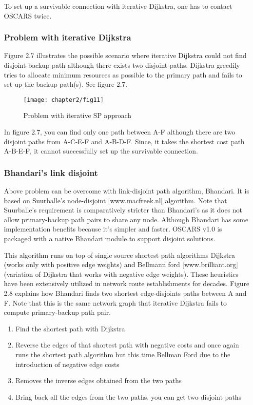 To set up a survivable connection with iterative Dijkstra, one has to contact OSCARS twice.

\subsubsection{Problem with iterative Dijkstra}
\indent Figure 2.7 illustrates the possible scenario where iterative Dijkstra could not find disjoint-backup path although there exists two disjoint-paths. Dijkstra greedily tries to allocate minimum resources as possible to the primary path and fails to set up the backup path(s). See figure 2.7.
\begin{figure*}[hbt!]
\centering
\texttt{[image: chapter2/fig11]}
\caption{Problem with iterative SP approach}
\label{fig:problemInIspa}
\end{figure*}

\indent In figure 2.7, you can find only one path between A-F although there are two disjoint paths from A-C-E-F and A-B-D-F. Since, it takes the shortest cost path A-B-E-F, it cannot successfully set up the survivable connection.


\subsubsection{Bhandari's link disjoint} 
Above problem can be overcome with link-disjoint path algorithm, Bhandari. It is based on Suurballe's node-disjoint [www.macfreek.nl] algorithm. Note that Suurballe's requirement is comparatively stricter than Bhandari's as it does not allow primary-backup path pairs to share any node. Although Bhandari has some implementation benefits because it's simpler and faster. OSCARS v1.0 is packaged with a native Bhandari module to support disjoint solutions. 

This algorithm runs on top of single source shortest path algorithms Dijkstra (works only with positive edge weights) and Bellmann ford [www.brilliant.org] (variation of Dijkstra that works with negative edge weights). These heuristics have been extensively utilized in network route establishments for decades. Figure 2.8 explains how Bhandari finds two shortest edge-disjoints paths between A and F. Note that this is the same network graph that iterative Dijkstra fails to compute primary-backup path pair.

\begin{enumerate}[leftmargin=*,label=(\alph*)]
\item Find the shortest path with Dijkstra
\item Reverse the edges of that shortest path with negative costs and once again runs the shortest path algorithm but this time Bellman Ford due to the introduction of negative edge costs
\item Removes the inverse edges obtained from the two paths
\item Bring back all the edges from the two paths, you can get two disjoint paths
\end{enumerate}

